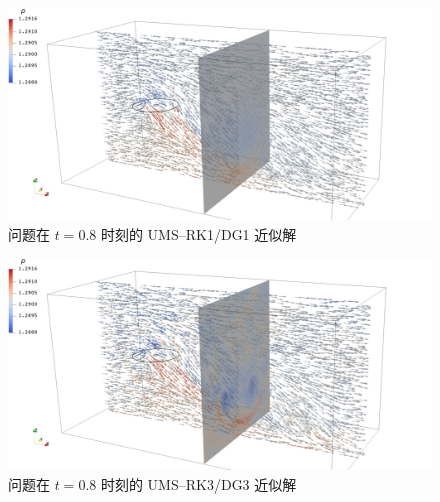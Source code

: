 \begin{figure}[h!]
\begin{centering}
\includegraphics[width=1\textwidth,height=0.26\textheight,keepaspectratio]{figures/forward/p=1/Frame80}
\par\end{centering}
\caption{\label{fig:forward_t=00003D8e-1_p=00003D1}问题在
$t=0.8$ 时刻的 UMS–RK1/DG1 近似解}
\end{figure}

\begin{figure}[h!]
\begin{centering}
\includegraphics[width=1\textwidth,height=0.26\textheight,keepaspectratio]{figures/forward/p=3/Frame80}
\par\end{centering}
\caption{\label{fig:forward_t=00003D8e-1_p=00003D3}问题在
$t=0.8$ 时刻的 UMS–RK3/DG3 近似解}
\end{figure}

